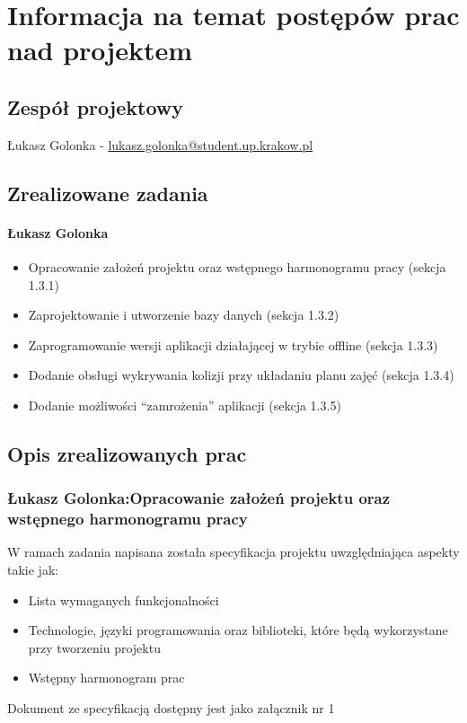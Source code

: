 \documentclass[12pt,a4paper,oneside]{article}
\theoremstyle{definition}
\numberwithin{equation}{section}
\begin{document}
\tableofcontents


\newpage

\section{Informacja na temat postępów prac nad projektem}
\subsection{Zespół projektowy}
Łukasz Golonka - \href{mailto:lukasz.golonka@student.up.krakow.pl}{lukasz.golonka@student.up.krakow.pl}
\subsection{Zrealizowane zadania}
\paragraph{Łukasz Golonka}
\begin{itemize}
\item Opracowanie założeń projektu oraz wstępnego harmonogramu pracy (sekcja 1.3.1)
\item Zaprojektowanie i utworzenie bazy danych (sekcja 1.3.2)
\item Zaprogramowanie wersji aplikacji działającej w trybie offline (sekcja 1.3.3)
\item Dodanie obsługi wykrywania kolizji przy układaniu planu zajęć (sekcja 1.3.4)
\item Dodanie możliwości ``zamrożenia'' aplikacji (sekcja 1.3.5)
\end{itemize}


\subsection {Opis zrealizowanych prac}
\subsubsection{Łukasz Golonka:Opracowanie założeń projektu oraz wstępnego harmonogramu pracy}
W ramach zadania napisana została specyfikacja projektu uwzględniająca aspekty takie jak:
\begin{itemize}
	\item Lista wymaganych funkcjonalności
	\item Technologie, języki programowania oraz biblioteki, które będą wykorzystane przy tworzeniu projektu
	\item Wstępny harmonogram prac
\end{itemize}
Dokument ze specyfikacją dostępny jest jako załącznik nr 1
\end{document}
